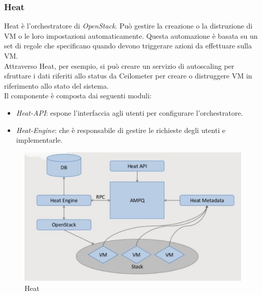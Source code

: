\documentclass{article}
\begin{document}
\subsubsection{Heat}
Heat è l'orchestratore di \textit{OpenStack}. Può gestire la creazione o la distruzione di VM o le loro impostazioni automaticamente. Questa automazione è basata su un set di regole che specificano quando devono triggerare azioni da effettuare sulla VM. \\
Attraverso Heat, per esempio, si può creare un servizio di autoscaling per sfruttare i dati riferiti allo status da Ceilometer per creare o distruggere VM in riferimento allo stato del sistema. \\
Il componente è composta dai seguenti moduli:
\begin{itemize}
    \item \textit{Heat-API}: espone l'interfaccia agli utenti per configurare l'orchestratore.
    \item \textit{Heat-Engine}: che è responsabile di gestire le richieste degli utenti e implementarle.
\end{itemize}
\begin{figure}[H]
    \centering
    \includegraphics[scale=0.5]{img/heat.png}
    \caption{Heat}
\end{figure}\noindent
\end{document}
